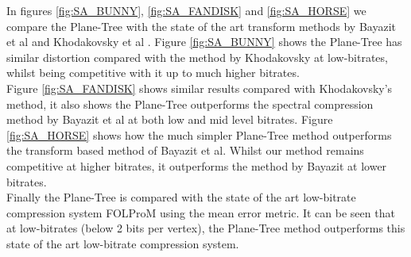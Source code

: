 In figures \ref{fig:SA_BUNNY}, \ref{fig:SA_FANDISK} and \ref{fig:SA_HORSE} we compare the Plane-Tree with the state of the art transform methods by Bayazit et al \cite{Bayazit103DMesh} and Khodakovsky et al \cite{Khodakovsky00Progressive}. Figure \ref{fig:SA_BUNNY} shows the Plane-Tree has similar distortion compared with the method by Khodakovsky at low-bitrates, whilst being competitive with it up to much higher bitrates. \\

Figure \ref{fig:SA_FANDISK} shows similar results compared with Khodakovsky's method, it also shows the Plane-Tree outperforms the spectral compression method by Bayazit et al at both low and mid level bitrates. Figure \ref{fig:SA_HORSE} shows how the much simpler Plane-Tree method outperforms the transform based method of Bayazit et al. Whilst our method remains competitive at higher bitrates, it outperforms the method by Bayazit at lower bitrates. \\

Finally the Plane-Tree is compared with the state of the art low-bitrate compression system FOLProM \cite{Peng10Feature} using the mean error metric. It can be seen that at low-bitrates (below 2 bits per vertex), the Plane-Tree method outperforms this state of the art low-bitrate compression system. \\